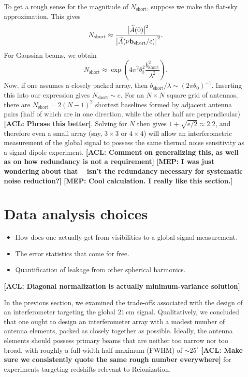 \documentclass[twolcolumn,apj,iop,numberedappendix]{emulateapj}
\newcommand{\acl}[1]{{\color{red} \textbf{[ACL:  #1]}}}
\newcommand{\mep}[1]{{\color{applegreen} \textbf{[MEP:  #1]}}}
\begin{document}
To get a rough sense for the magnitude of $N_\textrm{short}$, suppose we make the flat-sky approximation. This gives
\begin{equation}
N_\textrm{short} \approx \frac{\big{|} \widetilde{A}(0)\big{|}^2}{\big{|} \widetilde{A}(\nu \mathbf{b}_\textrm{short} / c)\big{|}^2}.
\end{equation}
For Gaussian beams, we obtain
\begin{equation}
N_\textrm{short} \approx \exp \left( 4 \pi^2 \theta_b^2 \frac{b_\textrm{short}^2}{\lambda^2} \right).
\end{equation}
Now, if one assumes a closely packed array, then $b_\textrm{short}/ \lambda \sim (2\pi \theta_0)^{-1}$. Inserting this into our expression gives $N_\textrm{short} \sim e$. For an $N \times N$ square grid of antennas, there are $N_\textrm{short} = 2(N-1)^2$ shortest baselines formed by adjacent antenna pairs (half of which are in one direction, while the other half are perpendicular) \acl{Phrase this better}. Solving for $N$ then gives $1 + \sqrt{e/2} \approx 2.2$, and therefore even a small array (say, $3\times 3$ or $4\times 4$) will allow an interferometric measurement of the global signal to possess the same thermal noise sensitivity as a signal dipole experiment. \acl{Comment on generalizing this, as well as on how redundancy is not a requirement} \mep{I was just wondering about that -- isn't the redundancy necessary for systematic noise reduction?} \mep{Cool calculation. I really like this section.}


\section{Data analysis choices}
\label{sec:MathForm}
\begin{itemize}
\item How does one actually get from visibilities to a global signal measurement.
\item The error statistics that come for free.
\item Quantification of leakage from other spherical harmonics.
\end{itemize}
\acl{Diagonal normalization is actually minimum-variance solution}

In the previous section, we examined the trade-offs associated with the design of an interferometer targeting the global $21\,\textrm{cm}$ signal. Qualitatively, we concluded that one ought to design an interferometer array with a modest number of antenna elements, packed as closely together as possible. Ideally, the antenna elements should possess primary beams that are neither too narrow nor too broad, with roughly a full-width-half-maximum (FWHM) of $\sim 25^\circ$ \acl{Make sure we consistently quote the same rough number everywhere} for experiments targeting redshifts relevant to Reionization.
\end{document}
